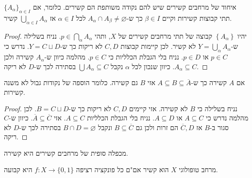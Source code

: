 \documentclass{tstextbook}
\begin{document}
\begin{proposition}
איחוד של מרחבים קשירים שיש להם נקודה משותפת הם קשירים. כלומר, אם \(\{ A_{\alpha} \}_{\alpha \in I}\) תתי קבוצות קשירות וקיים \(\beta \in I\) כך ש-\(A_{\alpha} \cap A_{\beta}\neq \varnothing\) לכל \(\alpha \in I\) אז \(\bigcup_{\alpha \in I}A_{\alpha}\) קשיר.

\end{proposition}
\begin{proof}
יהיו \(\left\{  A_{\alpha}  \right\}\) קבוצה של תתי מרחבים קשירים של \(X\), ותהי \(p \in \bigcap_{\alpha} A_{\alpha}\). נניח בשלילה ש-\(Y=\bigcup_{\alpha}A_{\alpha}\) לא קשיר. לכן קיימות קבוצות \(C,D\) לא ריקות כך ש-\(Y=C\sqcup D\). נדרש כי \(p \in C\) או \(p \in D\). נניח בלי הגבלת הכלליות כי \(p \in C\). מהלמה כיוון ש-\(A_{\alpha}\) קשירה ולכן \(A_{\alpha}\subseteq C\). כיוון שנכון לכל \(\alpha\) נקבל \(\bigcup A_{\alpha}\subseteq C\) בסתירה לכך ש-\(D\) לא ריקה.

\end{proof}
\begin{proposition}
אם \(A\) קשירה כך ש-\(A\subseteq B\subseteq \overline{A}\) אזי \(B\) גם קשירה. כלומר הוספה של נקודות גבול לא משנה קשירות. 

\end{proposition}
\begin{proof}
נניח בשלילה כי \(B\) לא קשירה. אזי קיימים \(C,D\) לא ריקות כך ש-\(B=C\sqcup D\). לכן מהלמה נדרש כי \(A\subseteq C\) או \(A\subseteq D\). נניח בלי הגבלת הכלליות \(A\subseteq C\). אזי \(\overline{A}\subseteq \overline{C}\). כיוון ש-\(C\) סגור ב-\(B\) אז \(\overline{C},D\) הם זרות ולכן גם \(B\subseteq \overline{C}\) ונקבל \(B\cap D=\varnothing\) בסתירה לכך ש-\(D\) לא ריקה. 

\end{proof}
\begin{proposition}
מכפלה סופית של מרחבים קשירים היא קשירה.

\end{proposition}
\begin{proposition}
מרחב טופולוגי \(X\) הוא קשיר אם"ם כל פונקציה רציפה \(f:X\to \{ 0,1 \}\) היא קבועה.

\end{proposition}
\end{document}
